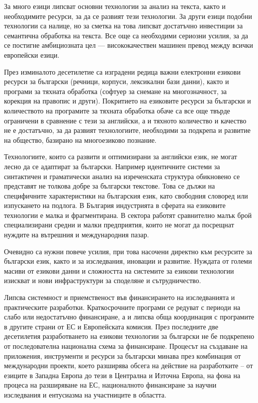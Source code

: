 \documentclass[]{../../metanetpaper}
\begin{document}
\begin{multicols}{2}
За много езици липсват основни технологии за анализ на текста, както и
необходимите ресурси, за да се развият тези технологии. За други езици
подобни технологии са налице, но за сметка на това липсват достатъчно
инвестиции за семантична обработка на текста. Все още са необходими
сериозни усилия, за да се постигне амбициозната цел — висококачествен
машинен превод между всички европейски езици.

През изминалото десетилетие са изградени редица важни електронни
езикови ресурси за български (речници, корпуси, лексикални бази
данни), както и програми за тяхната обработка (софтуер за снемане на
многозначност, за корекция на правопис и други). Покритието на
езиковите ресурси за български и количеството на програмите за тяхната
обработка обаче са все още твърде ограничени в сравнение с тези за
английски, а и тяхното количество и качество не е достатъчно, за да
развият технологиите, необходими за подкрепа и развитие на общество,
базирано на многоезиково познание.

Технологиите, които са развити и оптимизирани за английски език, не
могат лесно да се адаптират за български. Например идентичните системи
за синтактичен и граматически анализ на изреченската структура
обикновено се представят не толкова добре за български текстове. Това
се дължи на специфичните характеристики на българския език, като
свободния словоред или изпускането на подлога.  В България индустрията
в сферата на езиковите технологии е малка и фрагментирана. В сектора
работят сравнително малък брой специализирани средни и малки
предприятия, които не могат да посрещнат нуждите на вътрешния и
международния пазар.

Очевидно са нужни повече усилия, при това насочени директно към
ресурсите за български език, както и за изследвания, иновации и
развитие.  Нуждата от големи масиви от езикови данни и сложността на
системите за езикови технологии изискват и нови инфраструктури за
споделяне и сътрудничество.

Липсва системност и приемственост във финансирането на изследванията и
практическите разработки. Краткосрочните програми се редуват с периоди
на слабо или недостатъчно финансиране, а и липсва обща координация с
програмите в другите страни от ЕС и Европейската комисия.  През
последните две десетилетия разработването на езикови технологии за
български не бе подкрепено от последователна национална схема за
финансиране. Процесът на създаване на приложения, инструменти и
ресурси за български минава през комбинация от международни проекти,
което разширява обсега на действие на разработките – от езиците в
Западна Европа до тези в Централна и Източна Европа, на фона на
процеса на разширяване на ЕС, националното финансиране за научни
изследвания и ентусиазма на участниците в областта.


\end{multicols}
\end{document}
